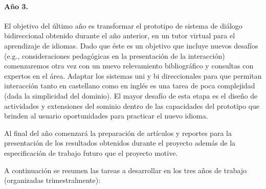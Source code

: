 \documentclass[11pt]{article}
\begin{document}
\paragraph{A\~no 3.} El objetivo del \'ultimo a\~no es transformar el prototipo
de sistema de di\'alogo bidireccional obtenido durante el a\~no anterior, en un
tutor virtual para el aprendizaje de idiomas.  Dado que
\'este es un objetivo que incluye nuevos desaf\'ios (e.g., consideraciones
pedag\'ogicas en la presentaci\'on de la interacci\'on) comenzaremos otra
vez con un nuevo relevamiento bibliogr\'afico y consultas con expertos en
el \'area.  Adaptar los sistemas uni y bi direccionales para que permitan
interacci\'on tanto en castellano como en ingl\'es es una tarea de poca
complejidad (dada la simplicidad del dominio).  El mayor desaf\'io de esta etapa
es el dise\~no de
actividades y extensiones del sominio dentro de las capacidades del prototipo
que brinden al
usuario oportunidades para practicar el nuevo idioma.

Al final del a\~no comenzar\'a la preparaci\'on de art\'iculos y reportes para
la presentaci\'on de los resultados obtenidos durante el proyecto adem\'as de
la especificaci\'on de trabajo futuro que el proyecto motive.

\medskip

\noindent
A continuaci\'on se resumen las tareas a desarrollar en los tres a\~nos de
trabajo (organizadas trimestralmente):
\end{document}

